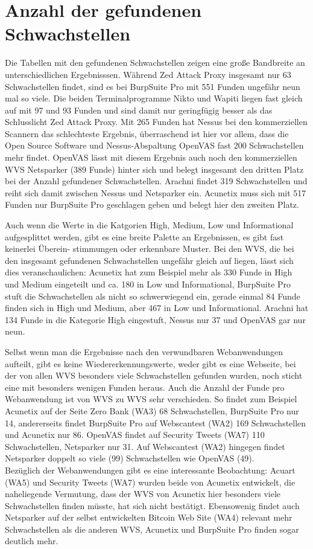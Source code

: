\documentclass[12pt,oneside,a4paper,parskip,pointlessnumbers]{scrbook}
\begin{document}
  \section{Anzahl der gefundenen Schwachstellen}
  Die Tabellen mit den gefundenen Schwachstellen zeigen eine große Bandbreite an unterschiedlichen Ergebnisssen. Während Zed Attack Proxy insgesamt nur 63 Schwachstellen findet, sind es bei BurpSuite Pro mit 551 Funden ungefähr neun mal so viele. Die beiden Terminalprogramme Nikto und Wapiti liegen fast gleich auf mit 97 und 93 Funden und sind damit nur geringfügig besser als das Schlusslicht Zed Attack Proxy.
  Mit 265 Funden hat Nessus bei den kommerziellen Scannern das schlechteste Ergebnis, überraschend ist hier vor allem, dass die Open Source Software und Nessus-Abspaltung OpenVAS fast 200 Schwachstellen mehr findet.
  OpenVAS lässt mit diesem Ergebnis auch noch den kommerziellen WVS Netsparker (389 Funde) hinter sich und belegt insgesamt den dritten Platz bei der Anzahl gefundener Schwachstellen. Arachni findet 319 Schwachstellen und reiht sich damit zwischen Nessus und Netsparker ein. Acunetix muss sich mit 517 Funden nur BurpSuite Pro geschlagen geben und belegt hier den zweiten Platz.

  Auch wenn die Werte in die Katgorien High, Medium, Low und Informational aufgesplittet werden, gibt es eine breite Palette an Ergebnissen, es gibt fast keinerlei Überein- stimmungen oder erkennbare Muster. Bei den WVS, die bei den insgesamt gefundenen Schwachstellen ungefähr gleich auf liegen, lässt sich dies veranschaulichen: Acunetix hat zum Beispiel mehr als 330 Funde in High und Medium eingeteilt und ca. 180 in Low und Informational, BurpSuite Pro stuft die Schwachstellen als nicht so schwerwiegend ein,  gerade einmal 84 Funde finden sich in High und Medium, aber 467 in Low und Informational. Arachni hat 134 Funde in die Kategorie High eingestuft, Nessus nur 37 und OpenVAS gar nur neun.

  Selbst wenn man die Ergebnisse nach den verwundbaren Webanwendungen aufteilt, gibt es keine Wiedererkennungswerte, weder gibt es eine Webseite, bei der von allen WVS besonders viele Schwachstellen gefunden wurden, noch sticht eine mit besonders wenigen Funden heraus. Auch die Anzahl der Funde pro Webanwendung ist von WVS zu WVS sehr verschieden. So findet zum Beispiel Acunetix auf der Seite Zero Bank (WA3) 68 Schwachstellen, BurpSuite Pro nur 14, andererseits findet BurpSuite Pro auf Webscantest (WA2) 169 Schwachstellen und Acunetix nur 86. OpenVAS findet auf Security Tweets (WA7) 110 Schwachstellen, Netsparker nur 31. Auf Webscantest (WA2) hingegen findet Netsparker doppelt so viele (99) Schwachstellen wie OpenVAS (49).\\
  Bezüglich der Webanwendungen gibt es eine interessante Beobachtung:  Acuart (WA5) und Security Tweets (WA7) wurden beide von Acunetix entwickelt, die naheliegende Vermutung, dass der WVS von Acunetix hier besonders viele Schwachstellen finden müsste, hat sich nicht bestätigt.
  Ebensowenig findet auch Netsparker auf der selbst entwickelten Bitcoin Web Site (WA4) relevant mehr Schwachstellen als die anderen WVS, Acunetix und BurpSuite Pro finden sogar deutlich mehr.
\end{document}

